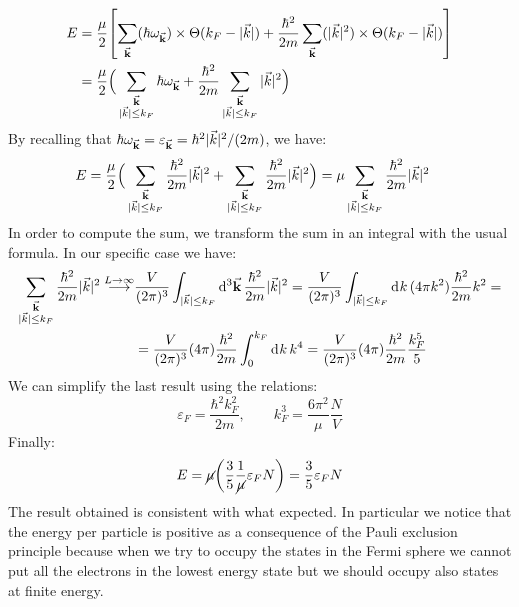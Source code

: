 \documentclass[11pt, a4paper, twoside, openright]{article}
\begin{document}
\begin{equation*}
  \begin{split}
  E &= \frac{\mu}{2}
  \qty[
  \sum_{\va{k}}^{} ( \hbar   \omega _{\va{k}})
  \times  \Theta (k_F- | \vec{k} | )
  + \frac{\hbar ^2}{2m}
  \sum_{\va{k}}^{} ( | \vec{k} | ^2)
  \times  \Theta (k_F- | \vec{k} | )
  ]  \\
  &=
  \frac{\mu}{2}
 \Big(
 \sum_{\substack{\va{k} \\  | \vec{k} | \le k_F } }^{} \hbar   \omega _{\va{k}}
 + \frac{\hbar ^2}{2m}
\sum_{\substack{\va{k} \\  | \vec{k} | \le k_F } }^{}
| \vec{k} | ^2
 \Big)
  \end{split}
\end{equation*}
By recalling that \( \hbar \omega_{\va{k}} = \varepsilon_{\va{k}} = \hbar^2 | \vec{k} |^2/(2m)   \), we have:
\begin{equation*}
  \begin{split}
  E &=
  \frac{\mu}{2}
 \Big(
 \sum_{\substack{\va{k} \\  | \vec{k} | \le k_F } }^{} \frac{\hbar ^2}{2m} | \vec{k} | ^2
 +
\sum_{\substack{\va{k} \\  | \vec{k} | \le k_F } }^{}
\frac{\hbar ^2}{2m} | \vec{k} | ^2
 \Big)
 = \mu  \sum_{\substack{\va{k} \\  | \vec{k} | \le k_F } }^{} \frac{\hbar ^2}{2m} | \vec{k} | ^2
  \end{split}
\end{equation*}
In order to compute the sum, we transform the sum in an integral with the usual formula. In our specific case we have:
\begin{equation*}
  \begin{split}
  \sum_{\substack{\va{k} \\  | \vec{k} | \le k_F } }^{}
  \frac{\hbar ^2}{2m} | \vec{k} | ^2   \overset{L \rightarrow \infty }{\longrightarrow  }
  & \frac{V}{(2 \pi )^3} \int_{| \vec{k} | \le k_F}^{} \dd[3]{\va{k}}
  \frac{\hbar ^2}{2m} | \vec{k} | ^2
  =
  \frac{V}{(2 \pi )^3} \int_{| \vec{k} | \le k_F}^{} \dd[]{k} (4 \pi k^2)
  \frac{\hbar ^2}{2m} k ^2 = \\
  &=
  \frac{V}{(2 \pi )^3} (4 \pi ) \frac{\hbar ^2}{2m} \int_{0}^{k_F} \dd[]{k} k^4
  =\frac{V}{(2 \pi )^3} (4 \pi ) \frac{\hbar ^2}{2m} \frac{k_F^5}{5}
  \end{split}
\end{equation*}
We can simplify the last result using the relations:
\begin{equation*}
  \varepsilon _F = \frac{\hbar ^2 k_F^2}{2m}, \qquad k_F^3 =  \frac{6 \pi ^2}{\mu } \frac{N}{V}
\end{equation*}
Finally:
\begin{equation}
  E = \cancel{ \mu }  \qty( \frac{3}{5} \frac{1}{\cancel{ \mu } } \varepsilon _F N)
  = \frac{3}{5} \varepsilon _F N
\end{equation}
The result obtained is consistent with what expected. In particular we notice that the energy per particle is positive as a consequence of the Pauli exclusion principle because when we try to occupy the states in the Fermi sphere we cannot put all the electrons in the lowest energy state but we should occupy also states at finite energy.
\end{document}
